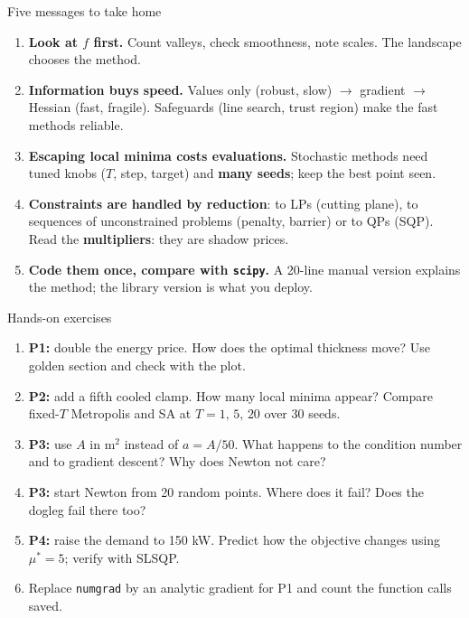 \documentclass[aspectratio=169,10pt]{beamer}
\begin{document}
\begin{frame}{Five messages to take home}
  \begin{enumerate}
    \item \textbf{Look at $f$ first.} Count valleys, check smoothness, note scales. The landscape chooses the method.
    \item \textbf{Information buys speed.} Values only (robust, slow) $\to$ gradient $\to$ Hessian (fast, fragile). Safeguards (line search, trust region) make the fast methods reliable.
    \item \textbf{Escaping local minima costs evaluations.} Stochastic methods need tuned knobs ($T$, step, target) and \textbf{many seeds}; keep the best point seen.
    \item \textbf{Constraints are handled by reduction}: to LPs (cutting plane), to sequences of unconstrained problems (penalty, barrier) or to QPs (SQP). Read the \textbf{multipliers}: they are shadow prices.
    \item \textbf{Code them once, compare with \texttt{scipy}.} A 20-line manual version explains the method; the library version is what you deploy.
  \end{enumerate}
\end{frame}

\begin{frame}{Hands-on exercises}
  \small
  \begin{enumerate}
    \item \textbf{P1:} double the energy price. How does the optimal thickness move? Use golden section and check with the plot.
    \item \textbf{P2:} add a fifth cooled clamp. How many local minima appear? Compare fixed-$T$ Metropolis and SA at $T=1,\,5,\,20$ over 30 seeds.
    \item \textbf{P3:} use $A$ in m$^2$ instead of $a=A/50$. What happens to the condition number and to gradient descent? Why does Newton not care?
    \item \textbf{P3:} start Newton from 20 random points. Where does it fail? Does the dogleg fail there too?
    \item \textbf{P4:} raise the demand to 150 kW. Predict how the objective changes using $\mu^\ast=5$; verify with SLSQP.
    \item Replace \texttt{numgrad} by an analytic gradient for P1 and count the function calls saved.
  \end{enumerate}
\end{frame}
\end{document}
